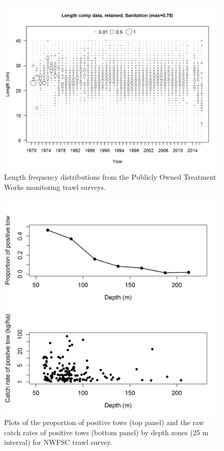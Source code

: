 \documentclass[12pt,]{article}
\begin{document}
\FloatBarrier

\begin{figure}[htbp]
\centering
\includegraphics{r4ss/plots_mod1/comp_lendat_bubflt7mkt2_page2.png}
\caption{Length frequency distributions from the Publicly Owned
Treatment Works monitoring trawl surveys.
\label{fig:Fleet7_comp_lendat_bubflt10mkt2}}
\end{figure}

\FloatBarrier

\begin{figure}[htbp]
\centering
\includegraphics{Figures/NWFSCtrawl_posdepth.png}
\caption{Plots of the proportion of positive tows (top panel) and the
raw catch rates of positive tows (bottom panel) by depth zones (25 m
interval) for NWFSC trawl survey.
\label{fig:Fleet8_NWFSCtrawl_posdepth}}
\end{figure}
\end{document}
